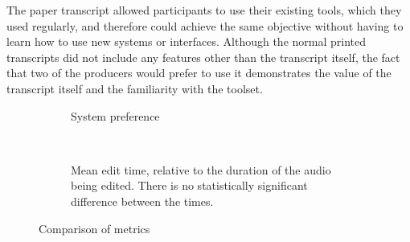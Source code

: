 The paper transcript allowed participants to use their existing tools, which they used regularly, and therefore could
achieve the same objective without having to learn how to use new systems or interfaces. Although the normal printed
transcripts did not include any features other than the transcript itself, the fact that two of the producers would
prefer to use it demonstrates the value of the transcript itself and the familiarity with the toolset.

\begin{figure}[p]
  \begin{subfigure}[b]{0.5\textwidth}
    \centering
    \label{fig:preference}
    \caption{System preference}
  \end{subfigure}
  ~
  \begin{subfigure}[b]{0.5\textwidth}
    \centering
    \label{fig:paperspeed}
    \caption{Mean edit time, relative to the duration of the audio being edited. There is no statistically significant
    difference between the times.}
  \end{subfigure}
  \caption{Comparison of metrics}
\end{figure}

